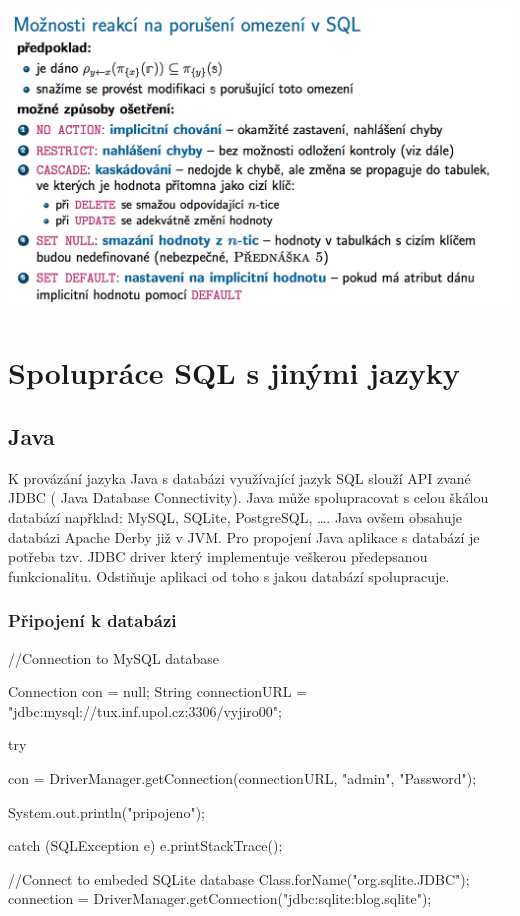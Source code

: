 \documentclass[10pt,a4paper]{article}
\begin{document}
	\includegraphics[scale=0.4]{img/70}

\section{Spolupráce SQL s jinými jazyky}
	\subsection{Java}
	K provázání jazyka Java s databázi využívající jazyk SQL slouží API zvané JDBC ( Java Database Connectivity). Java může spolupracovat s celou škálou databází napřklad: MySQL, SQLite, PostgreSQL, \dots. Java ovšem obsahuje databázi Apache Derby již v JVM. Pro propojení Java aplikace s databází je potřeba tzv. JDBC driver který implementuje veškerou předepsanou funkcionalitu. Odstiňuje aplikaci od toho s jakou databází spolupracuje. 
	
	\subsubsection{Připojení k databázi}
	\begin{Java}
//Connection to MySQL database

Connection con = null;
String connectionURL = "jdbc:mysql://tux.inf.upol.cz:3306/vyjiro00";
         
try {
   con = DriverManager.getConnection(connectionURL, 
	"admin", "Password");
	
   System.out.println("pripojeno");
} catch (SQLException e) {
   e.printStackTrace();
}

//Connect to embeded SQLite database
Class.forName("org.sqlite.JDBC");
connection = DriverManager.getConnection("jdbc:sqlite:blog.sqlite");
	\end{Java}
	
\end{document}
